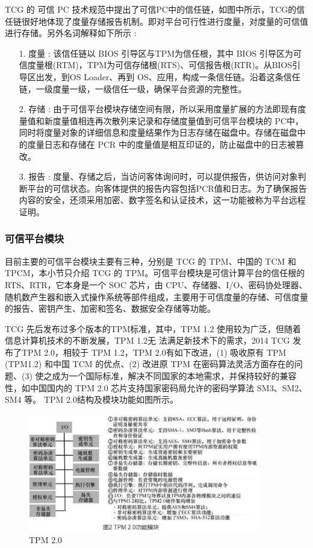 TCG 的 可信 PC 技术规范中提出了可信PC中的信任链，如图中所示，TCG的信任链很好地体现了度量存储报告机制。即对平台可行性进行度量，对度量的可信值进行存储。另外名词解释如下所示 :

\begin{itemize}
\item [1.] 度量 : 该信任链以 BIOS 引导区与TPM为信任根，其中 BIOS 引导区为可信度量根(RTM)，TPM为可信存储根(RTS)、可信报告根(RTR)。从BIOS引导区出发，到OS Loader、再到 OS、应用，构成一条信任链。沿着这条信任链，一级度量一级，一级信任一级，确保平台资源的完整性。
\item [2.] 存储 : 由于可信平台模块存储空间有限，所以采用度量扩展的方法即现有度量值和新度量值相连再次散列来记录和存储度量值到可信平台模块的 PC中，同时将度量对象的详细信息和度量结果作为日志存储在磁盘中。存储在磁盘中的度量日志和存储在 PCR 中的度量值是相互印证的，防止磁盘中的日志被篡改。
\item [3.] 报告 : 度量、存储之后，当访问客体询问时，可以提供报告，供访问对象判断平台的可信状态。向客体提供的报告内容包括PCR值和日志。为了确保报告内容的安全，还须采用加密、数字签名和认证技术，这一功能被称为平台远程证明。
\end{itemize}

\subsubsection{可信平台模块}

目前主要的可信平台模块主要有三种，分别是 TCG 的 TPM、中国的 TCM 和 TPCM，本小节只介绍 TCG 的 TPM。可信平台模块是可信计算平台的信任根的 RTS、RTR，它本身是一个 SOC 芯片，由 CPU、存储器、I/O、密码协处理器、随机数产生器和嵌入式操作系统等部件组成，主要用于可信度量的存储、可信度量的报告、密钥产生、加密和签名、数据安全存储等功能。

TCG 先后发布过多个版本的TPM标准，其中，TPM 1.2 使用较为广泛，但随着信息计算机技术的不断发展，TPM 1.2无 法满足新技术下的需求，2014 TCG 发布了TPM 2.0，相较于 TPM 1.2，TPM 2.0有如下改进，(1) 吸收原有 TPM (TPM1.2) 和中国 TCM 的优点、(2) 改进原 TPM 在密码算法灵活方面存在的问题、(3) 使之成为一个国际标准，解决不同国家的本地需求，并保持较好的兼容性，如中国国内的 TPM 2.0 芯片支持国家密码局允许的密码学算法 SM3、SM2、SM4 等。 TPM 2.0结构及模块功能如图所示。

\begin{figure}[htb]
\centering 
\includegraphics[width=0.90\textwidth]{img/ch3m2.jpg} 
\caption{TPM 2.0}
\label{Test}
\end{figure}

